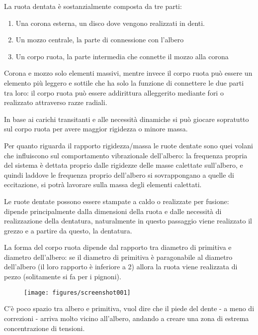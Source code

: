 \documentclass[a4paper, 15pt]{article}
\begin{document}
\begin{adjustwidth}{2in}{}
La ruota dentata è sostanzialmente composta da tre parti:
\begin{enumerate}
	\item Una corona esterna, un disco dove vengono realizzati in denti.
	\item Un mozzo centrale, la parte di connessione con l'albero
	\item Un corpo ruota, la parte intermedia che connette il mozzo alla corona
\end{enumerate}  
Corona e mozzo solo elementi massivi, mentre invece il  corpo ruota può essere un elemento più leggero e sottile che ha solo la funzione di connettere le due parti tra loro: il corpo ruota può essere addirittura alleggerito mediante fori o realizzato attraverso razze radiali. \newline 

In base ai carichi transitanti e alle necessità dinamiche si può giocare sopratutto sul corpo ruota per avere maggior rigidezza o minore massa. 

Per quanto riguarda il rapporto rigidezza/massa le ruote dentate sono quei volani che influiscono sul comportamento vibrazionale dell'albero: la frequenza propria del sistema è dettata proprio dalle rigidezze delle masse calettate sull'albero, e quindi laddove le frequenza proprio dell'albero si sovrappongano a quelle di eccitazione, si potrà lavorare sulla massa degli elementi calettati. \newline 

Le ruote dentate possono essere stampate a caldo o realizzate per fusione: dipende principalmente dalla dimensioni della ruota e dalle necessità di realizzazione della dentatura, naturalmente in questo passaggio viene realizzato il grezzo e a partire da questo, la dentatura. \newline 

La forma del corpo ruota dipende dal rapporto tra diametro di primitiva e diametro dell'albero: se il diametro di primitiva è paragonabile al diametro dell'albero (il loro rapporto è inferiore a 2) allora la ruota viene realizzata di pezzo (solitamente si fa per i pignoni). 
\begin{figure}[H]
	\centering
	\texttt{[image: figures/screenshot001]}
	\label{fig:screenshot001}
\end{figure}
C'è poco spazio tra albero e primitiva, vuol dire che il piede del dente - a meno di correzioni - arriva molto vicino all'albero, andando a creare una zona di estrema concentrazione di tensioni. 


\end{adjustwidth}
\end{document}
